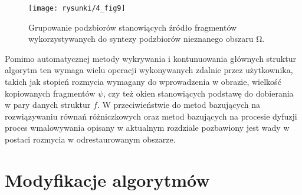 \documentclass[12pt, twoside, openany]{report}
\theoremstyle{definition}
\begin{document}
\begin{figure}[!h]
	\centering
	\texttt{[image: rysunki/4\_fig9]}
	\caption{Grupowanie podzbiorów stanowiących źródło fragmentów wykorzystywanych do syntezy podzbiorów nieznanego obszaru $\boldsymbol{\mathrm{\Omega }}$.}
\label{4_fig9}
\end{figure}
Pomimo automatycznej metody wykrywania i kontunuowania głównych struktur algorytm ten wymaga wielu operacji wykonywanych zdalnie przez użytkownika, takich jak stopień rozmycia wymagany do wprowadzenia w obrazie, wielkość kopiowanych fragmentów $\psi $, czy też okien stanowiących podstawę do dobierania w pary danych struktur $f$. W przeciwieństwie do metod bazujących na rozwiązywaniu równań różniczkowych oraz metod bazujących na procesie dyfuzji proces wmalowywania opisany w aktualnym rozdziale pozbawiony jest wady w postaci rozmycia w odrestaurowanym obszarze.
\chapter{Modyfikacje algorytmów}
\end{document}
